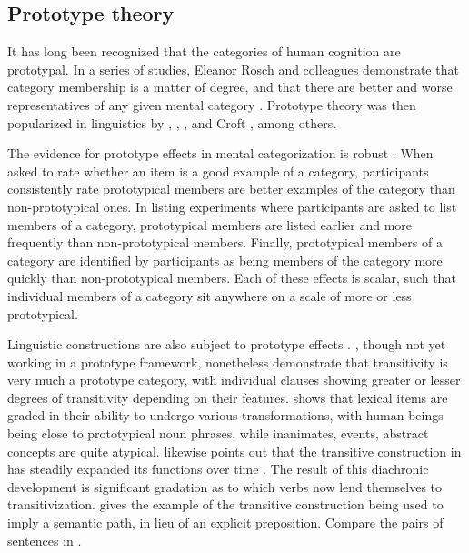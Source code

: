\subsection{Prototype theory}
\label{sec:2.4.1}

It has long been recognized that the categories of human cognition are prototypal. In a series of studies, Eleanor Rosch and colleagues demonstrate that category membership is a matter of degree, and that there are better and worse representatives of any given mental category \parencites{Rosch1973a}{Rosch1973b}{Rosch1975}{RoschMervis1975}{Roschetal1976}{Rosch1978}. Prototype theory was then popularized in linguistics by \textcite{Lakoff1987}, \textcite{Langacker1987}, \citeauthor{Taylor2003} , and Croft , among others.

The evidence for prototype effects in mental categorization is robust \parencite[46--47]{Taylor2003}. When asked to rate whether an item is a good example of a category, participants consistently rate prototypical members are better examples of the category than non-prototypical ones. In listing experiments where participants are asked to list members of a category, prototypical members are listed earlier and more frequently than non-prototypical members. Finally, prototypical members of a category are identified by participants as being members of the category more quickly than non-prototypical members. Each of these effects is scalar, such that individual members of a category sit anywhere on a scale of more or less prototypical.

Linguistic constructions are also subject to prototype effects \parencite[Ch.~12]{Taylor2003}. \textcite{HopperThompson1980}, though not yet working in a prototype framework, nonetheless demonstrate that transitivity is very much a prototype category, with individual clauses showing greater or lesser degrees of transitivity depending on their features. \textcite{Ross1972} shows that lexical items are graded in their ability to undergo various transformations, with human beings being close to prototypical noun phrases, while inanimates, events, abstract concepts are quite atypical. \textcite[§12.5]{Taylor2003} likewise points out that the transitive construction in  has steadily expanded its functions over time . The result of this diachronic development is significant gradation as to which verbs now lend themselves to transitivization. \textcite[236]{Taylor2003} gives the example of the transitive construction being used to imply a semantic path, in lieu of an explicit preposition. Compare the pairs of  sentences in .

